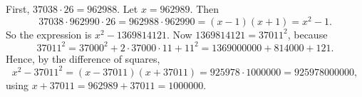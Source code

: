 First, $37038\cdot26=962988$. Let $x=962989$. Then
\[
37038\cdot962990\cdot26=962988\cdot962990=(x-1)(x+1)=x^2-1 .
\]
So the expression is $x^2-1369814121$. Now $1369814121=37011^2$, because
\[
37011^2=37000^2+2\cdot37000\cdot11+11^2=1369000000+814000+121 .
\]
Hence, by the difference of squares,
\[
x^2-37011^2=(x-37011)(x+37011)=925978\cdot1000000=\boxed{925978000000},
\]
using $x+37011=962989+37011=1000000$.
